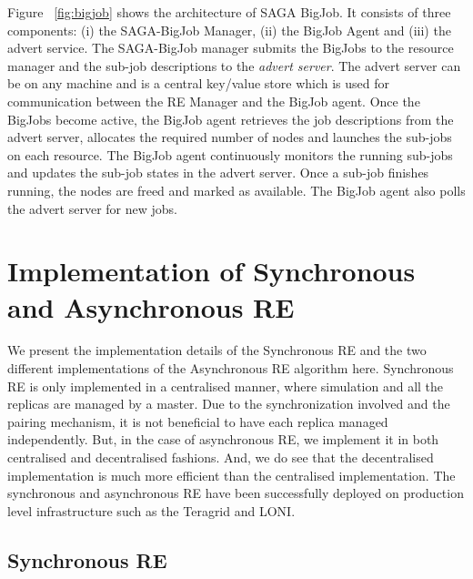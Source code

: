 \documentclass{rspublic}
\begin{document}
Figure ~\ref{fig:bigjob} shows the architecture of SAGA BigJob.
It consists of three components: (i) the SAGA-BigJob Manager, (ii) the BigJob Agent and (iii) the advert service. The SAGA-BigJob manager submits the BigJobs to the resource manager and the sub-job descriptions to the \emph{advert server}. The advert server can be on any machine and is a central key/value store which is used for communication between the RE Manager and the BigJob agent. Once the BigJobs become active, the BigJob agent retrieves the job descriptions from the advert server, allocates the required number of nodes and launches the sub-jobs on each resource. The BigJob agent continuously monitors the running sub-jobs and updates the sub-job states in the advert server. Once a sub-job finishes running, the nodes are freed and marked as available. The BigJob agent also polls the advert server for new jobs.


\section{Implementation of Synchronous and Asynchronous RE}
We present the implementation details of the Synchronous RE and the two different implementations of the Asynchronous RE algorithm here. Synchronous RE is only implemented in a centralised manner, where simulation and all the replicas are managed by a master. Due to the synchronization involved and the pairing mechanism, it is not beneficial to have each replica managed independently. But, in the case of asynchronous RE, we implement it in both centralised and decentralised  fashions. And, we do see that the decentralised implementation is much more efficient than the centralised implementation.
The synchronous and asynchronous RE have been successfully deployed on production level infrastructure such as the Teragrid and LONI. 

\subsection{Synchronous RE}
\end{document}
